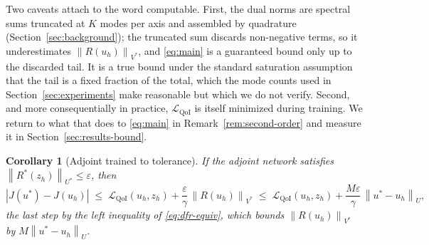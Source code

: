 \documentclass[preprint,11pt]{elsarticle}
\newtheorem{corollary}[theorem]{Corollary}
\newcommand{\norm}[1]{\left\|#1\right\|}
\begin{document}
Two caveats attach to the word computable. First, the dual norms are spectral sums truncated at $K$ modes per axis and assembled by quadrature (Section~\ref{sec:background}); the truncated sum discards non-negative terms, so it underestimates $\norm{R(u_h)}_{V^*}$, and \eqref{eq:main} is a guaranteed bound only up to the discarded tail. It is a true bound under the standard saturation assumption that the tail is a fixed fraction of the total, which the mode counts used in Section~\ref{sec:experiments} make reasonable but which we do not verify. Second, and more consequentially in practice, $\mathcal{L}_{\mathrm{QoI}}$ is itself minimized during training. We return to what that does to \eqref{eq:main} in Remark~\ref{rem:second-order} and measure it in Section~\ref{sec:results-bound}.

\begin{corollary}[Adjoint trained to tolerance]
\label{cor:tol}
If the adjoint network satisfies $\norm{R^*(z_h)}_{U^*} \leq \varepsilon$, then
\begin{equation*}
  |J(u^*) - J(u_h)|
  \;\leq\; \mathcal{L}_{\mathrm{QoI}}(u_h, z_h) + \frac{\varepsilon}{\gamma}\,\norm{R(u_h)}_{V^*}
  \;\leq\; \mathcal{L}_{\mathrm{QoI}}(u_h, z_h) + \frac{M\varepsilon}{\gamma}\,\norm{u^* - u_h}_U,
\end{equation*}
the last step by the left inequality of \eqref{eq:dfr-equiv}, which bounds $\norm{R(u_h)}_{V^*}$ by $M \norm{u^* - u_h}_U$.
\end{corollary}
\end{document}
